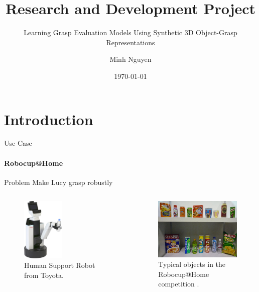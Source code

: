 \documentclass{beamer}
\author[Nguyen]{Minh Nguyen}
\title{Research and Development Project}
\subtitle{Learning Grasp Evaluation Models Using Synthetic 3D Object-Grasp Representations}
\institute[HBRS]{Hochschule Bonn-Rhein-Sieg}
\date{\today}
\begin{document}
{
\begin{frame}
\titlepage
\end{frame}
}

\section{Introduction}
\begin{frame}{Use Case}
    \framesubtitle{Robocup@Home}%
    \begin{block}{Problem}
        Make Lucy grasp robustly
    \end{block}
    \begin{columns}[onlytextwidth]
        \begin{figure}[b]
            \includegraphics[width=0.45\textwidth]{hsr_stock_photo}
            \caption{Human Support Robot from Toyota.}
        \end{figure}
        \begin{figure}[b]
            \includegraphics[width=\textwidth]{robocup_typical_objects}
            \caption{Typical objects in the Robocup@Home competition \cite{robocupRulebook2018}.}
        \end{figure}
    \end{columns}
\end{frame}
\end{document}
